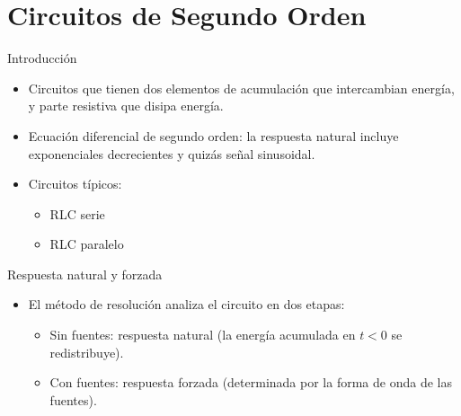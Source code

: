 \documentclass[aspectratio=169, usenames,svgnames,dvipsnames]{beamer}
\begin{document}
\section{Circuitos de Segundo Orden}
\label{sec:org95a60d6}
\begin{frame}[label={sec:orgd4d1142}]{Introducción}
\begin{itemize}
\item Circuitos que tienen \alert{dos elementos de acumulación} que intercambian energía, y parte resistiva que disipa energía.
\item \alert{Ecuación diferencial de segundo orden}: la respuesta natural incluye exponenciales decrecientes y quizás señal sinusoidal.
\item Circuitos típicos:
\begin{itemize}
\item RLC serie
\item RLC paralelo
\end{itemize}
\end{itemize}
\end{frame}
\begin{frame}[label={sec:orgd5cbd6c}]{Respuesta natural y forzada}
\begin{itemize}
\item El método de resolución analiza el circuito en dos etapas:
\begin{itemize}
\item Sin fuentes: \alert{respuesta natural} (la energía acumulada en \(t < 0\) se redistribuye).
\item Con fuentes: \alert{respuesta forzada} (determinada por la forma de onda de las fuentes).
\end{itemize}
\end{itemize}
\end{frame}
\end{document}
